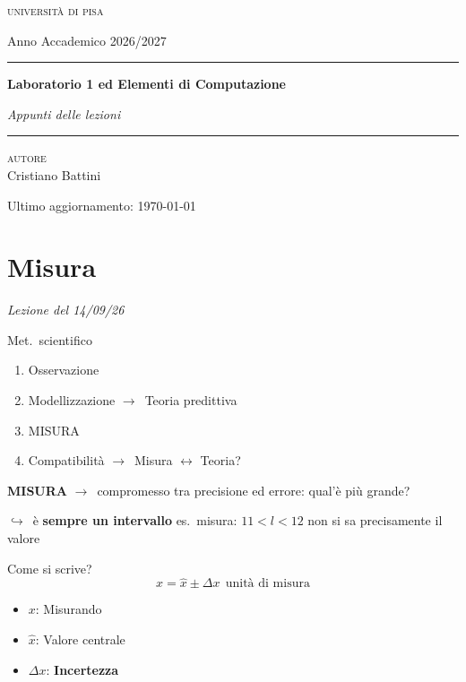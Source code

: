 \documentclass[11pt,a4paper,oneside]{book}
\newcommand{\corso}{Laboratorio 1 ed Elementi di Computazione}
\newcommand{\sottotitolo}{Appunti delle lezioni}
\newcommand{\autore}{Cristiano Battini}
\newcommand{\universita}{Università di Pisa}
\newcommand{\annoaccademico}{Anno Accademico 2026/2027}
\newcommand{\lezione}[1]{\par\medskip\noindent
  {\small\itshape\color{grigio}Lezione del #1}\par\smallskip}
\newcommand{\fr}{\ensuremath{\rightarrow}}
\newcommand{\giu}{\ensuremath{\hookrightarrow}}
\newcommand{\chiave}[1]{\textbf{#1}}
\begin{document}
\begin{titlepage}
\centering
{\large\scshape\lsstyle\MakeLowercase{\universita}\par}
\vspace{0.3cm}
{\annoaccademico\par}
\vspace{5.5cm}
\rule{\textwidth}{0.8pt}\par
\vspace{0.6cm}
{\fontsize{28}{34}\selectfont\bfseries\corso\par}
\vspace{0.5cm}
{\Large\itshape\sottotitolo\par}
\vspace{0.5cm}
\rule{\textwidth}{0.8pt}\par
\vspace{2.5cm}
{\small\scshape autore}\\[3pt]\autore\par
\vfill
{\small Ultimo aggiornamento: \today\par}
\end{titlepage}

\frontmatter
\tableofcontents
\mainmatter
\setcounter{secnumdepth}{1}


\section{Misura}
\lezione{14/09/26}

Met.\ scientifico
\begin{enumerate}[label=\arabic* --]
  \item Osservazione
  \item Modellizzazione \fr\ Teoria predittiva
  \item MISURA
  \item Compatibilità \fr\ Misura $\leftrightarrow$ Teoria?
\end{enumerate}

\chiave{MISURA} \fr\ compromesso tra precisione ed errore: qual'è più grande?

\giu\ è \chiave{sempre un intervallo} \qquad es.\ misura: $11 < l < 12$ \quad non si sa precisamente il valore

Come si scrive?
\[
  x = \hat{x} \pm \Delta x \ \ \text{unità di misura}
\]
\begin{itemize}
  \item $x$: Misurando
  \item $\hat{x}$: Valore centrale
  \item $\Delta x$: \chiave{Incertezza}
\end{itemize}
\end{document}
